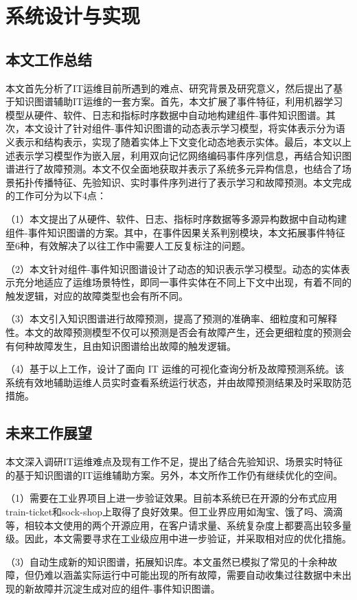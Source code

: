 \chapter{系统设计与实现}
\section{本文工作总结}
本文首先分析了IT运维目前所遇到的难点、研究背景及研究意义，然后提出了基于知识图谱辅助IT运维的一套方案。首先，本文扩展了事件特征，利用机器学习模型从硬件、软件、日志和指标时序数据中自动地构建组件-事件知识图谱。其次，本文设计了针对组件-事件知识图谱的动态表示学习模型，将实体表示分为语义表示和结构表示，实现了随着实体上下文变化动态地表示实体。最后，本文以上述表示学习模型作为嵌入层，利用双向记忆网络编码事件序列信息，再结合知识图谱进行了故障预测。本文不仅全面地获取并表示了系统多元异构信息，也结合了场景拓扑传播特征、先验知识、实时事件序列进行了表示学习和故障预测。本文完成的工作可分为以下4点：

（1）本文提出了从硬件、软件、日志、指标时序数据等多源异构数据中自动构建组件-事件知识图谱的方案。其中，在事件因果关系判别模块，本文拓展事件特征至6种，有效解决了以往工作中需要人工反复标注的问题。

（2）本文针对组件-事件知识图谱设计了动态的知识表示学习模型。动态的实体表示充分地适应了运维场景特性，即同一事件实体在不同上下文中出现，有着不同的触发逻辑，对应的故障类型也会有所不同。

（3）本文引入知识图谱进行故障预测，提高了预测的准确率、细粒度和可解释性。本文的故障预测模型不仅可以预测是否会有故障产生，还会更细粒度的预测会有何种故障发生，且由知识图谱给出故障的触发逻辑。

（4）基于以上工作，设计了面向 IT 运维的可视化查询分析及故障预测系统。该系统有效地辅助运维人员实时查看系统运行状态，并由故障预测结果及时采取防范措施。

\section{未来工作展望}
本文深入调研IT运维难点及现有工作不足，提出了结合先验知识、场景实时特征的基于知识图谱的IT运维辅助方案。另外，本文所作工作仍有继续优化的空间。

（1）需要在工业界项目上进一步验证效果。目前本系统已在开源的分布式应用train-ticket和sock-shop上取得了良好效果。但工业界应用如淘宝、饿了吗、滴滴等，相较本文使用的两个开源应用，在客户请求量、系统复杂度上都要高出较多量级。因此，本文需要寻求在工业级应用中进一步验证，并采取相对应的优化措施。

（3）自动生成新的知识图谱，拓展知识库。本文虽然已模拟了常见的十余种故障，但仍难以涵盖实际运行中可能出现的所有故障，需要自动收集过往数据中未出现的新故障并沉淀生成对应的组件-事件知识图谱。